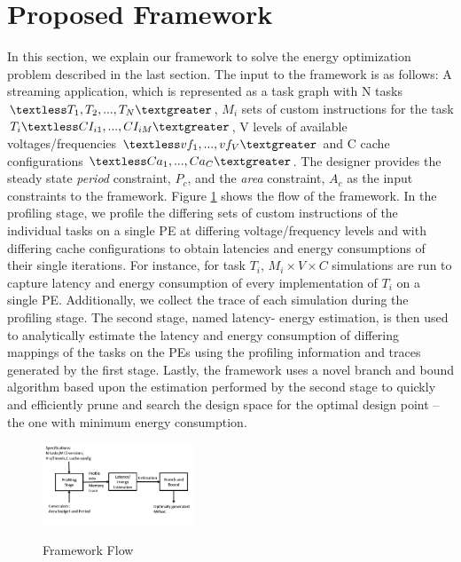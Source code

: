\section{Proposed Framework}
\label{sec:framework}

In this section, we explain our framework to solve the energy
optimization problem described in the last section. The input to the
framework is as follows: A streaming application, which is represented
as a task graph with N tasks $\textless T_{1}, T_{2}, ..., T_{N}
\textgreater$, $M_{i}$ sets of custom instructions for the task $T_i
\textless CI_{i1}, ..., CI_{iM}\textgreater$, V levels of available
voltages/frequencies $\textless vf_{1}, ..., vf_{V}\textgreater$ and C
cache configurations $\textless Ca_{1}, ..., Ca_{C}\textgreater$. The
designer provides the steady state \textit{period} constraint, $P_{c}
$, and the \textit{area} constraint, $A_{c}$ as the input constraints
to the framework. Figure \ref{fig:framework} shows the flow of the
framework. In the profiling stage, we profile the differing sets of
custom instructions of the individual tasks on a single PE at differing
voltage/frequency levels and with differing cache configurations to
obtain latencies and energy consumptions of their single iterations. For
instance, for task $T_{i}$, $M_{i} \times V \times C$ simulations are
run to capture latency and energy consumption of every implementation
of $T_{i}$ on a single PE. Additionally, we collect the trace of each
simulation during the profiling stage. The second stage, named latency-
energy estimation, is then used to analytically estimate the latency
and energy consumption of differing mappings of the tasks on the PEs
using the profiling information and traces generated by the first stage.
Lastly, the framework uses a novel branch and bound algorithm based upon
the estimation performed by the second stage to quickly and efficiently
prune and search the design space for the optimal design point -- the one
with minimum energy consumption.

\begin{figure}[h]
\center
\includegraphics[width=0.40\textwidth, height=0.27\textwidth]{framework.png}
\label{fig:framework}
\caption {Framework Flow}
\end{figure}

